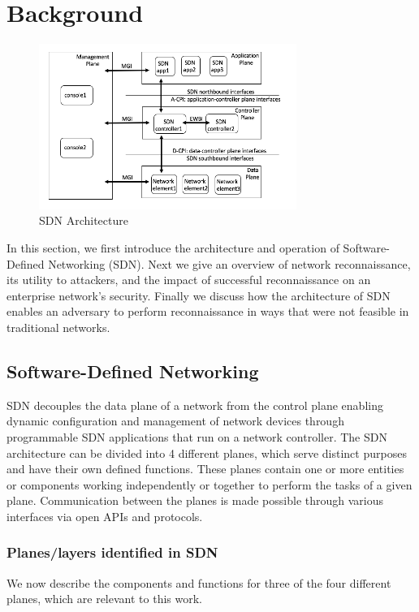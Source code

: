 \section{Background}
\label{sec:background}

\begin{figure}[t]
  \centering 
  \includegraphics[width=3.3in]{img/sdn-arch.png} 
  \caption{SDN Architecture} 
  \label{fig:sdn-arch} 
\end{figure}

In this section, we first introduce the architecture and operation of
Software-Defined Networking (SDN). Next we give an overview of network 
reconnaissance, its utility to attackers, and the impact of successful
reconnaissance on an enterprise network's security. Finally  we discuss
how the architecture of SDN enables an adversary to perform reconnaissance 
in ways that were not feasible in traditional networks. 

\subsection{Software-Defined Networking}
SDN decouples the data plane of a network from the control plane
enabling  dynamic configuration and management of network devices through
programmable SDN applications that run on a network controller. The SDN
architecture can be divided into 4 different planes, which serve distinct
purposes and have their own defined functions. These planes contain one
or more entities or components working independently or together to
perform the tasks of a given plane. Communication between the planes is
made possible through various interfaces via open APIs and protocols. 

\subsubsection{Planes/layers identified in SDN}

We now describe the components and functions for three of the four 
different planes, which are relevant to this work. 

